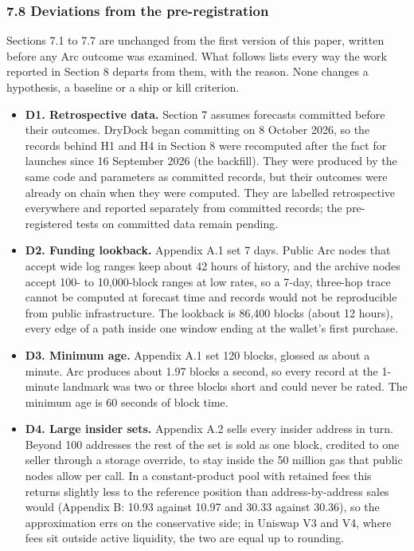 \subsubsection{7.8 Deviations from the pre-registration}\label{deviations-from-the-pre-registration}

Sections 7.1 to 7.7 are unchanged from the first version of this paper, written before any Arc outcome was examined. What follows lists every way the work reported in Section 8 departs from them, with the reason. None changes a hypothesis, a baseline or a ship or kill criterion.

\begin{itemize}
\tightlist
\item
  \textbf{D1. Retrospective data.} Section 7 assumes forecasts committed before their outcomes. DryDock began committing on 8 October 2026, so the records behind H1 and H4 in Section 8 were recomputed after the fact for launches since 16 September 2026 (the backfill). They were produced by the same code and parameters as committed records, but their outcomes were already on chain when they were computed. They are labelled retrospective everywhere and reported separately from committed records; the pre-registered tests on committed data remain pending.
\item
  \textbf{D2. Funding lookback.} Appendix A.1 set 7 days. Public Arc nodes that accept wide log ranges keep about 42 hours of history, and the archive nodes accept 100- to 10,000-block ranges at low rates, so a 7-day, three-hop trace cannot be computed at forecast time and records would not be reproducible from public infrastructure. The lookback is 86,400 blocks (about 12 hours), every edge of a path inside one window ending at the wallet's first purchase.
\item
  \textbf{D3. Minimum age.} Appendix A.1 set 120 blocks, glossed as about a minute. Arc produces about 1.97 blocks a second, so every record at the 1-minute landmark was two or three blocks short and could never be rated. The minimum age is 60 seconds of block time.
\item
  \textbf{D4. Large insider sets.} Appendix A.2 sells every insider address in turn. Beyond 100 addresses the rest of the set is sold as one block, credited to one seller through a storage override, to stay inside the 50 million gas that public nodes allow per call. In a constant-product pool with retained fees this returns slightly less to the reference position than address-by-address sales would (Appendix B: 10.93 against 10.97 and 30.33 against 30.36), so the approximation errs on the conservative side; in Uniswap V3 and V4, where fees sit outside active liquidity, the two are equal up to rounding.

\end{itemize}
